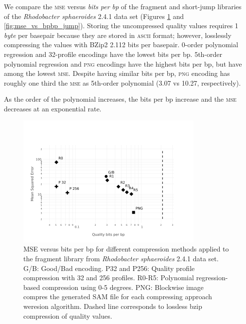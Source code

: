 \documentclass{bioinfo}
\begin{document}
We compare the \textsc{mse} versus \emph{bits per bp} of the fragment and short-jump libraries of the  \textit{Rhodobacter sphaeroides} 2.4.1 data set (Figures \ref{fig:mse_vs_bpbp_frag} and \ref{fig:mse_vs_bpbp_jump}). Storing the uncompressed quality values requires 1 \emph{byte} per basepair because they are stored in \textsc{ascii} format; however, losslessly compressing the values with BZip2 2.112 bits per basepair. 0-order polynomial regression and 32-profile encodings have the lowest bits per bp. 5th-order polynomial regression and \textsc{png} encodings have the highest bits per bp, but have among the lowest \textsc{mse}. Despite having similar bits per bp, \textsc{png} encoding has roughly one third the \textsc{mse} as 5th-order polynomial (3.07 vs 10.27, respectively).

As the order of the polynomial increases, the bits per bp increase and the \textsc{mse} decreases at an exponential rate.

\begin{figure}[!tpb]%
\centerline{\includegraphics[width=3.65in]{mse_frag.png}}
\caption{MSE versus bits per bp for different compression methods applied to the fragment library from \textit{Rhodobacter sphaeroides} 2.4.1 data set. G/B: Good/Bad encoding. P32 and P256: Quality profile compression with 32 and 256 profiles. R0-R5: Polynomial regression-based compression using 0-5 degrees. PNG: Blockwise image compres the generated SAM file for each compressing approach weresion algorithm. Dashed line corresponds to lossless bzip compression of quality values. \em}\label{fig:mse_vs_bpbp_frag}
\end{figure}
\end{document}
